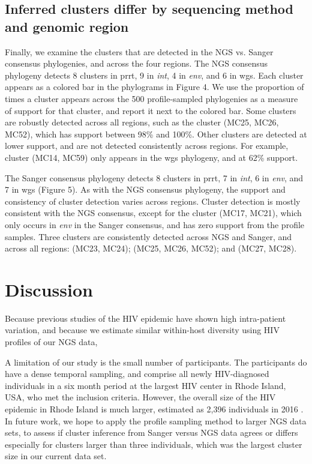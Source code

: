 \documentclass[letterpaper]{article}
\begin{document}
\subsection*{Inferred clusters differ by sequencing method and genomic region}

Finally, we examine the clusters that are detected in the NGS vs. Sanger consensus phylogenies, and across the four regions. The NGS consensus phylogeny detects 8 clusters in prrt, 9 in \emph{int}, 4 in \emph{env}, and 6 in wgs. Each cluster appears as a colored bar in the phylograms in Figure 4. We use the proportion of times a cluster appears across the 500 profile-sampled phylogenies as a measure of support for that cluster, and report it next to the colored bar. Some clusters are robustly detected across all regions, such as the cluster (MC25, MC26, MC52), which has support between 98\% and 100\%. Other clusters are detected at lower support, and are not detected consistently across regions. For example, cluster (MC14, MC59) only appears in the wgs phylogeny, and at 62\% support.  

The Sanger consensus phylogeny detects 8 clusters in prrt, 7 in \emph{int}, 6 in \emph{env}, and 7 in wgs (Figure 5). As with the NGS consensus phylogeny, the support and consistency of cluster detection varies across regions. Cluster detection is mostly consistent with the NGS consensus, except for the cluster (MC17, MC21), which only occurs in \emph{env} in the Sanger consensus, and has zero support from the profile samples. Three clusters are consistently detected across NGS and Sanger, and across all regions: (MC23, MC24); (MC25, MC26, MC52); and (MC27, MC28).

\section*{Discussion}

Because previous studies of the HIV epidemic have shown high intra-patient variation, 
and because we estimate similar within-host diversity using HIV profiles of our NGS data,

A limitation of our study is the small number of participants. The participants do have a dense temporal sampling, and comprise all newly HIV-diagnosed individuals in a six month period at the largest HIV center in Rhode Island, USA, who met the inclusion criteria. However, the overall size of the HIV epidemic in Rhode Island is much larger, estimated as 2,396 individuals in 2016 \parencite{ridoh}. In future work, we hope to apply the profile sampling method to larger NGS data sets, to assess if cluster inference from Sanger versus NGS data agrees or differs especially for clusters larger than three individuals, which was the largest cluster size in our current data set.
\end{document}

